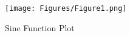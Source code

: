 \documentclass[
11pt, %
a4paper, %
oneside, %
headinclude,footinclude, %
BCOR5mm, %
]{scrartcl}
\begin{document}
\begin{figure}[H]
\centering %
\texttt{[image: Figures/Figure1.png]} 
\caption[Sine Function Plot]{Sine Function Plot} %
\label{fig:gallery} 
\end{figure}

\renewcommand{\refname}{\spacedlowsmallcaps{References}} %
\raggedright



\end{document}
